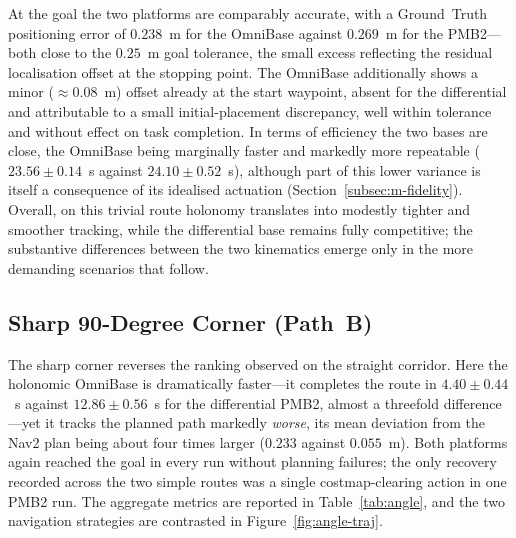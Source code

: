 At the goal the two platforms are comparably accurate, with a Ground~Truth positioning error of $0.238$~m for the OmniBase against $0.269$~m for the PMB2---both close to the $0.25$~m goal tolerance, the small excess reflecting the residual localisation offset at the stopping point. The OmniBase additionally shows a minor ($\approx 0.08$~m) offset already at the start waypoint, absent for the differential and attributable to a small initial-placement discrepancy, well within tolerance and without effect on task completion. In terms of efficiency the two bases are close, the OmniBase being marginally faster and markedly more repeatable ($23.56 \pm 0.14$~s against $24.10 \pm 0.52$~s), although part of this lower variance is itself a consequence of its idealised actuation (Section~\ref{subsec:m-fidelity}). Overall, on this trivial route holonomy translates into modestly tighter and smoother tracking, while the differential base remains fully competitive; the substantive differences between the two kinematics emerge only in the more demanding scenarios that follow.


\subsection{Sharp 90-Degree Corner (Path~B)}
\label{subsec:res-angle}

The sharp corner reverses the ranking observed on the straight corridor. Here the holonomic OmniBase is dramatically faster---it completes the route in $4.40 \pm 0.44$~s against $12.86 \pm 0.56$~s for the differential PMB2, almost a threefold difference---yet it tracks the planned path markedly \emph{worse}, its mean deviation from the Nav2 plan being about four times larger ($0.233$ against $0.055$~m). Both platforms again reached the goal in every run without planning failures; the only recovery recorded across the two simple routes was a single costmap-clearing action in one PMB2 run. The aggregate metrics are reported in Table~\ref{tab:angle}, and the two navigation strategies are contrasted in Figure~\ref{fig:angle-traj}.

